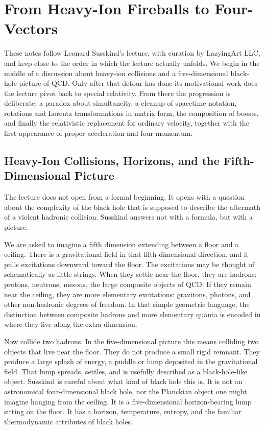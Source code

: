 \chapter{From Heavy-Ion Fireballs to Four-Vectors}

These notes follow Leonard Susskind's lecture, with curation by LazyingArt LLC, and keep close to the order in which the lecture actually unfolds. We begin in the middle of a discussion about heavy-ion collisions and a five-dimensional black-hole picture of QCD. Only after that detour has done its motivational work does the lecture pivot back to special relativity. From there the progression is deliberate: a paradox about simultaneity, a cleanup of spacetime notation, rotations and Lorentz transformations in matrix form, the composition of boosts, and finally the relativistic replacement for ordinary velocity, together with the first appearance of proper acceleration and four-momentum.

\section{Heavy-Ion Collisions, Horizons, and the Fifth-Dimensional Picture}

The lecture does not open from a formal beginning. It opens with a question about the complexity of the black hole that is supposed to describe the aftermath of a violent hadronic collision. Susskind answers not with a formula, but with a picture.

We are asked to imagine a fifth dimension extending between a floor and a ceiling. There is a gravitational field in that fifth-dimensional direction, and it pulls excitations downward toward the floor. The excitations may be thought of schematically as little strings. When they settle near the floor, they are hadrons: protons, neutrons, mesons, the large composite objects of QCD. If they remain near the ceiling, they are more elementary excitations: gravitons, photons, and other non-hadronic degrees of freedom. In that simple geometric language, the distinction between composite hadrons and more elementary quanta is encoded in where they live along the extra dimension.

Now collide two hadrons. In the five-dimensional picture this means colliding two objects that live near the floor. They do not produce a small rigid remnant. They produce a large splash of energy, a puddle or lump deposited in the gravitational field. That lump spreads, settles, and is usefully described as a black-hole-like object. Susskind is careful about what kind of black hole this is. It is not an astronomical four-dimensional black hole, nor the Planckian object one might imagine hanging from the ceiling. It is a five-dimensional horizon-bearing lump sitting on the floor. It has a horizon, temperature, entropy, and the familiar thermodynamic attributes of black holes.

